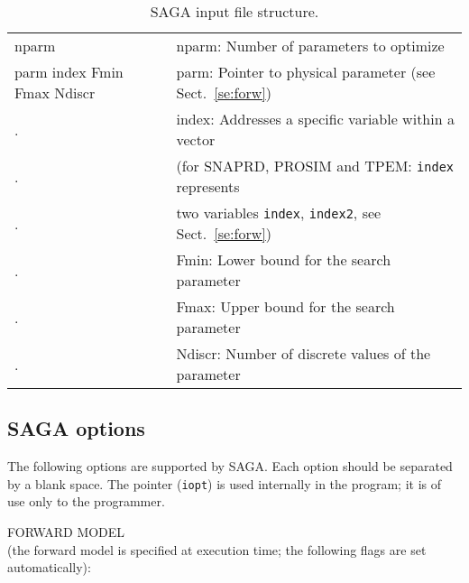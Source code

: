 \documentclass{saclantc}
\begin{document}
\begin{table}
\begin{center}
\begin{tabular}{|l|l|}
nparm  & nparm: Number of parameters  to optimize    \\ 
parm index Fmin Fmax Ndiscr &  parm: Pointer to 
physical parameter (see  Sect.\ \ref{se:forw}) \\
.     &index: Addresses a specific variable within a vector\\
.    &(for {\sf SNAPRD}, {\sf PROSIM} and {\sf TPEM}: {\tt index} represents \\
.     &  two variables {\tt index}, {\tt index2}, see Sect.\ \ref{se:forw})\\
.    & Fmin: Lower bound for the search parameter\\
.    & Fmax: Upper bound for the search parameter \\
.    & Ndiscr:	Number of discrete values of the parameter\\
\hline
\end{tabular}
\end{center}
\caption{ {\sf SAGA} input file structure.
 \label{tab:saga} }
\end{table} 


\subsection{SAGA options}
\label{se:sagaopt}
The following options are supported by  {\sf SAGA}. Each option should be
separated by a blank space. The pointer ({\tt iopt}) is
used internally in the program; 
it is of use only to the programmer.

\noindent FORWARD MODEL \\
(the forward model is specified at execution time; 
the following flags are set automatically):
\end{document}
